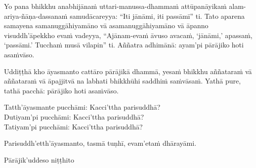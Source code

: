 Yo pana bhikkhu anabhijānaṁ uttari-manussa-dhammaṁ attūpanāyikaṁ alam-ariya-ñāṇa-dassanaṁ samudācareyya: “Iti jānāmi, iti passāmī” ti. Tato aparena samayena samanuggāhiyamāno vā asamanuggāhiyamāno vā āpanno visuddh’āpekkho evaṁ vadeyya, “Ajānam-evaṁ āvuso avacaṁ, ‘jānāmi,’ apassaṁ, ‘passāmi.’ Tucchaṁ musā vilapin” ti. Aññatra adhimānā: ayam'pi pārājiko hoti asaṁvāso.

\medskip

\begin{center}
Uddiṭṭhā kho āyasmanto cattāro pārājikā dhammā, yesaṁ bhikkhu aññataraṁ vā aññataraṁ vā āpajjitvā na labhati bhikkhūhi saddhiṁ saṁvāsaṁ. Yathā pure, tathā pacchā: pārājiko hoti asaṁvāso.

\smallskip

Tatth'āyasmante pucchāmi: Kacci'ttha parisuddhā?\\
Dutiyam'pi pucchāmi: Kacci'ttha parisuddhā?\\
Tatiyam'pi pucchāmi: Kacci'ttha parisuddhā?

\smallskip

Parisuddh'etth'āyasmanto, tasmā tuṇhī, evam'etaṁ dhārayāmi.
\end{center}

\begin{outro}
  Pārājik’uddeso niṭṭhito
\end{outro}

\clearpage
